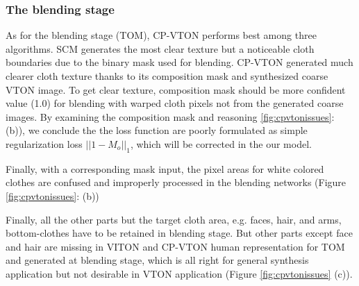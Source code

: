 \subsubsection{The blending stage}      
      
As for the blending stage (TOM), CP-VTON performs best among three algorithms. SCM generates the most clear texture but a noticeable cloth boundaries due to the binary mask used for blending. CP-VTON generated much clearer cloth texture thanks to its composition mask and synthesized coarse VTON image.
To get clear texture, composition mask should be more confident value (1.0) for blending with warped cloth pixels not from the generated coarse images. By examining the composition mask and reasoning \ref{fig:cpvtonissues}: (b)), we conclude the the loss function are poorly formulated as simple regularization loss $|| 1 - M_{o} ||_1$, which will be corrected in the our model.   

%


Finally, with a corresponding mask input, the pixel areas for white colored clothes are confused and improperly processed in the blending networks (Figure \ref{fig:cpvtonissues}: (b))

Finally, all the other parts but the target cloth area, e.g. faces, hair, and arms, bottom-clothes have to be retained in blending stage. But other parts except face and hair are missing in VITON and CP-VTON human representation for TOM and generated at blending stage, which is all right for general synthesis application but not desirable in VTON application (Figure \ref{fig:cpvtonissues} (c)). 



